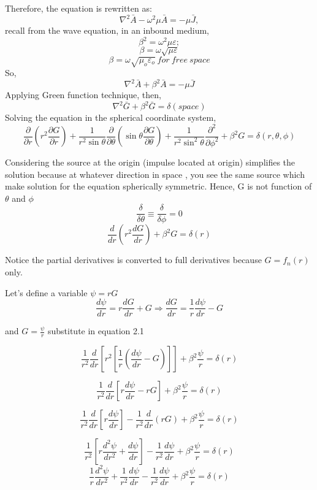 	
	Therefore, the equation is rewritten as:
	$$\nabla^{2}\bar{A}-\omega^{2}\mu\bar{A} = -\mu\bar{J},$$ recall from the wave equation, in an inbound medium,
	$$\beta^{2} = \omega^{2}\mu \varepsilon;$$
	$$\beta = \omega\sqrt{\mu \varepsilon}$$
	$$  \beta    = \omega\sqrt{\mu_o \varepsilon_o} \ for \ free  \ space$$
	So,
	$$\nabla^{2}\bar{A}+\beta^{2}\bar{A} = -\mu\bar{J}$$
	Applying Green function technique, then,
	$$\nabla^{2}\bar{G}+\beta^{2}\bar{G} = \delta(space)$$
	Solving the equation in the spherical coordinate system,
	$$\frac{\partial}{\partial r} (r^{2} \frac{\partial G}{\partial r} ) + \frac{1}{r^2 \sin \theta} \frac{\partial}{\partial  \theta}(\sin \theta \frac{\partial G}{\partial \theta}) + \frac{1}{r^{2}\sin^{2}\theta} \frac{\partial^{2}}{\partial\phi^{2}} + \beta^{2}G = \delta(r,\theta,\phi)$$
	\par Considering the source at the origin (impulse located at origin) simplifies the solution because at whatever direction in space , you see the same source which make solution for the equation spherically symmetric. Hence, G is not function of $\theta$ and $\phi$
	 $$\frac{\delta}{\delta \theta} \equiv \frac{\delta}{\delta \phi} = 0$$
	 \begin{equation}
	      	\frac{d}{d r}(r^{2}\frac{d G}{d r}) +  \beta^{2}G = \delta(r)
	 \end{equation}

	\par Notice the partial derivatives is converted to full derivatives because $G = f_{n}(r)$ only.\\
	\par Let's define a variable $\psi = rG$
	$$\frac{d\psi}{dr} = r\frac{dG}{dr} + G \Longrightarrow \frac{dG}{dr} = \frac{1}{r}{\frac{d\psi}{dr} - G}$$

	and $G = \frac{\psi}{r}$ substitute in equation 2.1
	
	$$\frac{1}{r^{2}}\frac{d}{dr}[r^{2}
	[\frac{1}{r}(\frac{d\psi}{dr} - G)]] + \beta^{2}\frac{\psi}{r} = \delta(r)$$
	
	$$\frac{1}{r^{2}}\frac{d}{dr}[r\frac{d\psi}{dr} - rG] + \beta^{2}\frac{\psi}{r} = \delta(r)$$
	
	$$\frac{1}{r^{2}}\frac{d}{dr}[r\frac{d\psi}{dr}] - \frac{1}{r^{2}}\frac{d}{dr}(rG) + \beta^{2}\frac{\psi}{r} = \delta(r)$$
	
	$$\frac{1}{r^{2}}[r\frac{d^{2}\psi}{dr^{2}} + \frac{d\psi}{dr}] - \frac{1}{r^{2}}\frac{d\psi}{dr} + \beta^{2}\frac{\psi}{r} = \delta(r)$$
	$$\frac{1}{r}\frac{d^{2}\psi}{dr^{2}} + \frac{1}{r^{2}}\frac{d\psi}{dr} - \frac{1}{r^{2}}\frac{d\psi}{dr} + \beta^{2}\frac{\psi}{r} = \delta(r)$$
	
